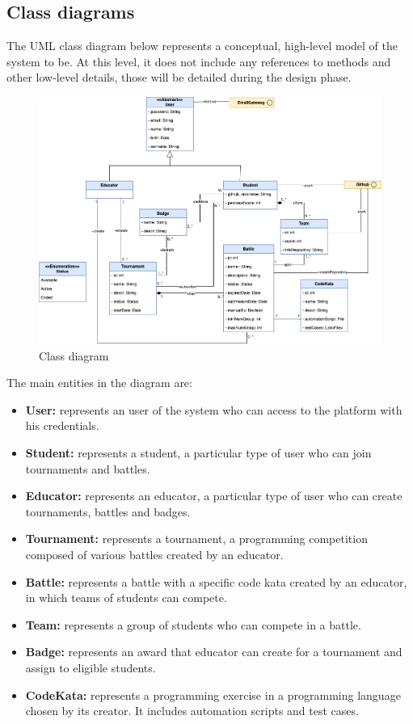 \subsection{Class diagrams}
The UML class diagram below represents a conceptual, high-level model of the system to be. 
At this level, it does not include any references to methods and other low-level details, those will be detailed during the design phase. \\

\begin{figure}[H]
      \centering
      \includegraphics[width=1\textwidth]{images/Class_Diagram.png}
      \caption{Class diagram}
\end{figure}

The main entities in the diagram are:
\begin{itemize}
    \item \textbf{User:} represents an user of the system who can access to the platform with his credentials.
    \item \textbf{Student:} represents a student, a particular type of user who can join tournaments and battles.
    \item \textbf{Educator:} represents an educator, a particular type of user who can create tournaments, battles and badges.
    \item \textbf{Tournament:} represents a tournament, a programming competition composed of various battles created by an educator.
    \item \textbf{Battle:} represents a battle with a specific code kata created by an educator, in which teams of students can compete.
    \item \textbf{Team: } represents a group of students who can compete in a battle.
    \item \textbf{Badge: } represents an award that educator can create for a tournament and assign to eligible students.
    \item \textbf{CodeKata: } represents a programming exercise in a programming language chosen by its creator. 
    It includes automation scripts and test cases.
\end{itemize}

